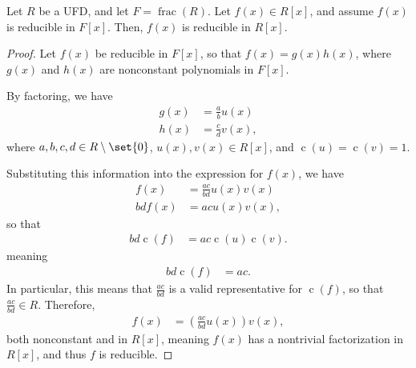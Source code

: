 \documentclass[10pt]{mypackage}
\begin{document}
\begin{corollary}
  Let $R$ be a UFD, and let $F = \operatorname{frac}\left( R \right)$. Let $f(x)\in R[x]$, and assume $f(x)$ is reducible in $F[x]$. Then, $f(x)$ is reducible in $R[x]$.
\end{corollary}
\begin{proof}
  Let $f(x)$ be reducible in $F[x]$, so that $f(x) = g(x)h(x)$, where $g(x)$ and $h(x)$ are nonconstant polynomials in $F[x]$.\newline

  By factoring, we have
  \begin{align*}
    g(x) &= \frac{a}{b}u(x)\\
    h(x) &= \frac{c}{d}v(x),
  \end{align*}
  where $a,b,c,d\in R\setminus \set{0}$, $u(x),v(x)\in R[x]$, and $ \operatorname{c}\left( u \right) = \operatorname{c}\left( v \right) = 1 $.\newline

  Substituting this information into the expression for $f(x)$, we have
  \begin{align*}
    f(x) &= \frac{ac}{bd}u(x)v(x)\\
    bd f(x) &= ac u(x)v(x),
  \end{align*}
  so that
  \begin{align*}
    bd \operatorname{c}\left( f \right)&= ac \operatorname{c}\left( u \right)\operatorname{c}\left( v \right).
  \end{align*}
  meaning
  \begin{align*}
    bd \operatorname{c}\left( f \right) &= ac.
  \end{align*}
  In particular, this means that $\frac{ac}{bd}$ is a valid representative for $\operatorname{c}\left( f \right)$, so that $ \frac{ac}{bd}\in R $. Therefore,
  \begin{align*}
    f(x) &= \left( \frac{ac}{bd}u(x) \right)v(x),
  \end{align*}
  both nonconstant and in $R[x]$, meaning $f(x)$ has a nontrivial factorization in $R[x]$, and thus $f$ is reducible.
\end{proof}
\end{document}
